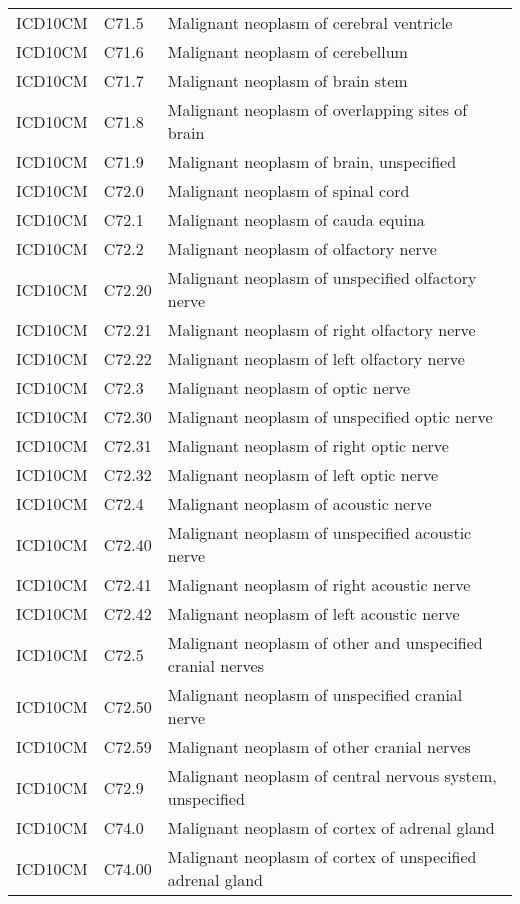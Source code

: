 \begin{longtable}{p{}p{}p{}}
  ICD10CM & C71.5 & Malignant neoplasm of cerebral ventricle \\ 
  ICD10CM & C71.6 & Malignant neoplasm of cerebellum \\ 
  ICD10CM & C71.7 & Malignant neoplasm of brain stem \\ 
  ICD10CM & C71.8 & Malignant neoplasm of overlapping sites of brain \\ 
  ICD10CM & C71.9 & Malignant neoplasm of brain, unspecified \\ 
  ICD10CM & C72.0 & Malignant neoplasm of spinal cord \\ 
  ICD10CM & C72.1 & Malignant neoplasm of cauda equina \\ 
  ICD10CM & C72.2 & Malignant neoplasm of olfactory nerve \\ 
  ICD10CM & C72.20 & Malignant neoplasm of unspecified olfactory nerve \\ 
  ICD10CM & C72.21 & Malignant neoplasm of right olfactory nerve \\ 
  ICD10CM & C72.22 & Malignant neoplasm of left olfactory nerve \\ 
  ICD10CM & C72.3 & Malignant neoplasm of optic nerve \\ 
  ICD10CM & C72.30 & Malignant neoplasm of unspecified optic nerve \\ 
  ICD10CM & C72.31 & Malignant neoplasm of right optic nerve \\ 
  ICD10CM & C72.32 & Malignant neoplasm of left optic nerve \\ 
  ICD10CM & C72.4 & Malignant neoplasm of acoustic nerve \\ 
  ICD10CM & C72.40 & Malignant neoplasm of unspecified acoustic nerve \\ 
  ICD10CM & C72.41 & Malignant neoplasm of right acoustic nerve \\ 
  ICD10CM & C72.42 & Malignant neoplasm of left acoustic nerve \\ 
  ICD10CM & C72.5 & Malignant neoplasm of other and unspecified cranial nerves \\ 
  ICD10CM & C72.50 & Malignant neoplasm of unspecified cranial nerve \\ 
  ICD10CM & C72.59 & Malignant neoplasm of other cranial nerves \\ 
  ICD10CM & C72.9 & Malignant neoplasm of central nervous system, unspecified \\ 
  ICD10CM & C74.0 & Malignant neoplasm of cortex of adrenal gland \\ 
  ICD10CM & C74.00 & Malignant neoplasm of cortex of unspecified adrenal gland \\ 

\end{longtable}

